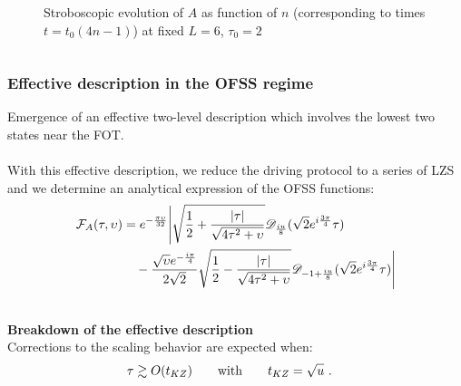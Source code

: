 \begin{frame}
\begin{columns}
\begin{column}{0.5\textwidth}
\begin{figure}[t]
                \caption{Stroboscopic evolution of $A$  as function of  $n$ (corresponding to times $t=t_0(4n-1)$) at fixed $L=6$, $\tau_0=2$}\label{fig:strobo}
            \end{figure}
        \end{column}
        \end{columns}
\end{frame}


\begin{frame}
    \frametitle{ Effective description in the OFSS regime}

    Emergence of an effective two-level description which involves the lowest two states near the FOT. \\
    $ $\\
    With this effective description, we reduce the driving protocol to a series of LZS and we determine an analytical expression of the OFSS functions:
    \begin{align}
        {\cal F}_A(\tau,\upsilon)
        \nonumber
        &=e^{-\frac{\pi\upsilon}{32}}\Bigg|\sqrt{\frac{1}{2}+ \frac{|\tau|}{\sqrt{4\tau^2+\upsilon}}} \mathscr{D}_{\frac{i u}{8}}(\sqrt{2}e^{i\frac{3\pi}{4}}\tau) 
        \nonumber\\
        &\quad -\frac{\sqrt{\upsilon} e^{-\frac{i\pi}{4}}}{2\sqrt{2}} \sqrt{\frac{1}{2}- \frac{|\tau|}{\sqrt{4\tau^2+\upsilon}}} \mathscr{D}_{-1+\frac{i u}{8}}(\sqrt{2}e^{i\frac{3\pi}{4}}\tau)\Bigg|
    \end{align}

    $ $\\
    {\bf Breakdown of the effective description}\\

    Corrections to the scaling behavior are expected when:
    \begin{align}
        \tau   \gtrsim O(t_{KZ}) 
        \qquad {\rm with} \qquad
        t_{KZ} & = \sqrt{u} \,\,. \nonumber
    \end{align}

\end{frame}